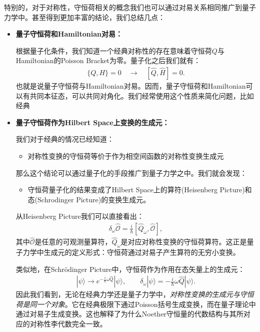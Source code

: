特别的，对于对称性，守恒荷相关的概念我们也可以通过对易关系相同推广到量子力学中。甚至得到更加丰富的结论，我们总结几点：
\begin{itemize}
  \item \textbf{量子守恒荷和Hamiltonian对易：}

    根据量子化条件，我们知道一个经典对称性的存在意味着守恒荷$ Q $与Hamiltonian的Poisson Bracket为零。量子化之后我们就有：
    \begin{align}
      \{ Q, H \} = 0 \quad \to \quad [\hat{Q}, \hat{H}] = 0.
    \end{align}
    也就是说量子守恒荷与Hamiltonian对易。因而，量子守恒荷和Hamiltonian可以有共同本征态，可以共同对角化。我们经常使用这个性质来简化问题，比如经典
  \item \textbf{量子守恒荷作为Hilbert Space上变换的生成元：}

    我们对于经典的情况已经知道：
    \begin{itemize}
      \item 对称性变换的守恒荷等价于作为相空间函数的对称性变换生成元
    \end{itemize}
    那么这个结论可以通过量子化的手段推广到量子力学之中。我们就会发现：
    \begin{itemize}
      \item 守恒荷量子化的结果变成了Hilbert Space上的算符(Heisenberg
        Picture)和态(Schrodinger Picture)的变换生成元。
    \end{itemize}
    从Heisenberg Picture我们可以直接看出：
    \begin{align}
      \delta_\omega \hat{\mathcal{O}} = \frac{i}{\hbar}
      [\hat{Q}_\omega, \hat{\mathcal{O}}],
    \end{align}
    其中$\hat{\mathcal{O}}$是任意的可观测量算符，$\hat{Q}_\omega$是对应对称性变换的守恒荷算符。这正是量子力学中生成元的定义形式：守恒荷通过对易子产生算符的无穷小变换。

    类似地，在Schrödinger Picture中，守恒荷作为作用在态矢量上的生成元：
    \begin{align}
      |\psi\rangle \to e^{-\frac{i}{\hbar}\omega \hat{Q}}|\psi\rangle, \qquad
      \delta_\omega |\psi\rangle = -\frac{i}{\hbar}\omega \hat{Q}|\psi\rangle.
    \end{align}
    因此我们看到，无论在经典力学还是量子力学中，\emph{对称性变换的生成元与守恒荷是同一个对象}。它在经典极限下通过Poisson括号生成变换，而在量子理论中通过对易子生成变换。这也解释了为什么Noether守恒量的代数结构与其所对应的对称性李代数完全一致。

\end{itemize}


